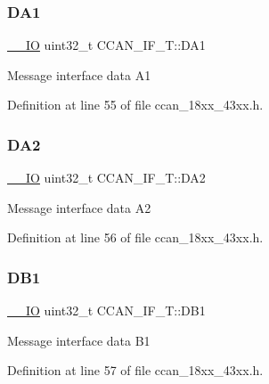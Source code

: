 \subsubsection{\texorpdfstring{D\+A1}{DA1}}
{\footnotesize\ttfamily \hyperlink{core__sc300_8h_aec43007d9998a0a0e01faede4133d6be}{\+\_\+\+\_\+\+IO} uint32\+\_\+t C\+C\+A\+N\+\_\+\+I\+F\+\_\+\+T\+::\+D\+A1}

Message interface data A1 

Definition at line 55 of file ccan\+\_\+18xx\+\_\+43xx.\+h.

\mbox{\label{struct_c_c_a_n___i_f___t_a1589de9f6b458f50ed2a1028d95e4ab5}} 
\subsubsection{\texorpdfstring{D\+A2}{DA2}}
{\footnotesize\ttfamily \hyperlink{core__sc300_8h_aec43007d9998a0a0e01faede4133d6be}{\+\_\+\+\_\+\+IO} uint32\+\_\+t C\+C\+A\+N\+\_\+\+I\+F\+\_\+\+T\+::\+D\+A2}

Message interface data A2 

Definition at line 56 of file ccan\+\_\+18xx\+\_\+43xx.\+h.

\mbox{\label{struct_c_c_a_n___i_f___t_a8e2cf9817f0f41c49efddcb93cf99e05}} 
\subsubsection{\texorpdfstring{D\+B1}{DB1}}
{\footnotesize\ttfamily \hyperlink{core__sc300_8h_aec43007d9998a0a0e01faede4133d6be}{\+\_\+\+\_\+\+IO} uint32\+\_\+t C\+C\+A\+N\+\_\+\+I\+F\+\_\+\+T\+::\+D\+B1}

Message interface data B1 

Definition at line 57 of file ccan\+\_\+18xx\+\_\+43xx.\+h.

\mbox{\label{struct_c_c_a_n___i_f___t_acda963ad737b4369a4de8e67ce9185e0}} 
